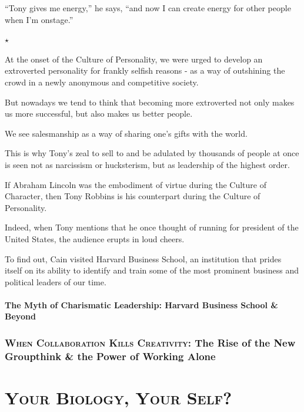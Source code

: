 \documentclass[oneside]{article}
\numberwithin{equation}{section}
\begin{document}
``Tony gives me energy,'' he says, ``and now I can create energy for other people when I'm onstage.''
\begin{center}
    $\star$
\end{center}
At the onset of the Culture of Personality, we were urged to develop an extroverted personality for frankly selfish reasons - as a way of outshining the crowd in a newly anonymous and competitive society.

But nowadays we tend to think that becoming more extroverted not only makes us more successful, but also makes us better people.

We see salesmanship as a way of sharing one's gifts with the world.

%
This is why Tony's zeal to sell to and be adulated by thousands of people at once is seen not as narcissism or hucksterism, but as leadership of the highest order.

If Abraham Lincoln was the embodiment of virtue during the Culture of Character, then Tony Robbins is his counterpart during the Culture of Personality.

Indeed, when Tony mentions that he once thought of running for president of the United States, the audience erupts in loud cheers.

%

To find out, Cain visited Harvard Business School, an institution that prides itself on its ability to identify and train some of the most prominent business and political leaders of our time.

\subsection{The Myth of Charismatic Leadership: Harvard Business School \& Beyond}


\section{\textsc{When Collaboration Kills Creativity}: The Rise of the New Groupthink \& the Power of Working Alone}


\part{\textsc{Your Biology, Your Self?}}
\end{document}
